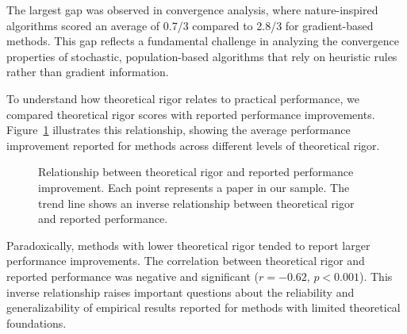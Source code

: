 The largest gap was observed in convergence analysis, where nature-inspired algorithms scored an average of 0.7/3 compared to 2.8/3 for gradient-based methods. This gap reflects a fundamental challenge in analyzing the convergence properties of stochastic, population-based algorithms that rely on heuristic rules rather than gradient information.

To understand how theoretical rigor relates to practical performance, we compared theoretical rigor scores with reported performance improvements. Figure~\ref{fig:theory_vs_practice} illustrates this relationship, showing the average performance improvement reported for methods across different levels of theoretical rigor.

\begin{figure}[h]
\centering
{}
\caption{Relationship between theoretical rigor and reported performance improvement. Each point represents a paper in our sample. The trend line shows an inverse relationship between theoretical rigor and reported performance.}
\label{fig:theory_vs_practice}
\end{figure}

Paradoxically, methods with lower theoretical rigor tended to report larger performance improvements. The correlation between theoretical rigor and reported performance was negative and significant ($r = -0.62$, $p < 0.001$). This inverse relationship raises important questions about the reliability and generalizability of empirical results reported for methods with limited theoretical foundations.

